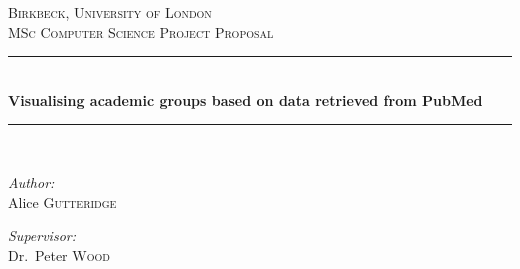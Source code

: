 \documentclass[PROP_AGutteridge_CS.tex]{subfiles}
\begin{document}
\newcommand{\HRule}{\rule{\linewidth}{0.5mm}}
\begin{center}

\thispagestyle{empty}

\textsc{\LARGE Birkbeck, University of London}\\[1.5cm]

\textsc{\Large MSc Computer Science Project Proposal}\\[0.5cm]

\HRule \\[0.4cm]
{ \huge \bfseries Visualising academic groups based on data retrieved from PubMed\\[0.4cm] }

\HRule \\[1.5cm]

\noindent
\begin{minipage}[t]{0.4\textwidth}
\begin{flushleft} \large
\emph{Author:}\\
Alice \textsc{Gutteridge}
\end{flushleft}
\end{minipage}%
\begin{minipage}[t]{0.4\textwidth}
\begin{flushright} \large
\emph{Supervisor:} \\
Dr.~Peter \textsc{Wood}
\end{flushright}
\end{minipage}

\vfill

\end{center}
\end{document}
